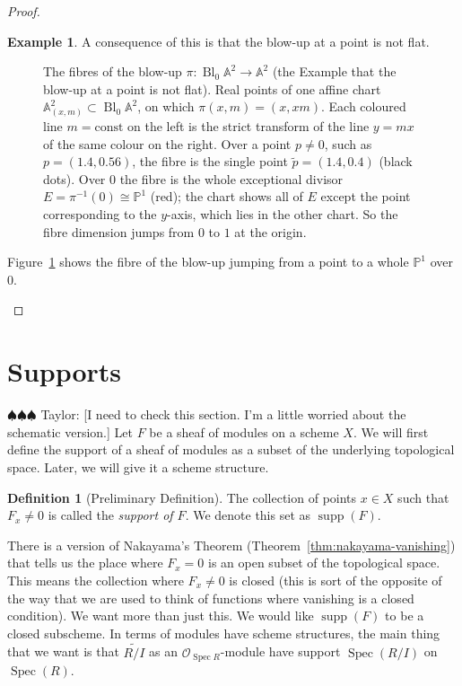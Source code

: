 \documentclass[12pt]{article}
\numberwithin{equation}{section}
\theoremstyle{definition}
\newtheorem{definition}[theorem]{Definition}
\newtheorem{example}[theorem]{Example}
\theoremstyle{remark}
\newcommand{\Ocal}{\mathcal{O}}
\newcommand{\PP}{\mathbb{P}}
\renewcommand{\AA}{\mathbb{A}}
\newcommand{\Spec}{\operatorname{Spec}}
\newcommand{\Bl}{\operatorname{Bl}}
\newcommand{\supp}{\operatorname{supp}}
\newcommand{\taylor}[1]{{\color{blue} \sf $\spadesuit\spadesuit\spadesuit$ Taylor: [#1]}}
\begin{document}
\begin{proof}
\begin{example}
	A consequence of this is that the blow-up at a point is not flat. 
\begin{figure}[H]
\centering

\caption{The fibres of the blow-up $\pi\colon\Bl_0\AA^2\to\AA^2$ (the Example that the blow-up at a point is not flat). Real points of one affine chart $\AA^2_{(x,m)}\subset\Bl_0\AA^2$, on which $\pi(x,m)=(x,xm)$. Each coloured line $m=\mathrm{const}$ on the left is the strict transform of the line $y=mx$ of the same colour on the right. Over a point $p\neq0$, such as $p=(1.4,0.56)$, the fibre is the single point $\tilde p=(1.4,0.4)$ (black dots). Over $0$ the fibre is the whole exceptional divisor $E=\pi^{-1}(0)\cong\PP^1$ (red); the chart shows all of $E$ except the point corresponding to the $y$-axis, which lies in the other chart. So the fibre dimension jumps from $0$ to $1$ at the origin.}\label{fig:blowup-not-flat}
\end{figure}
Figure~\ref{fig:blowup-not-flat} shows the fibre of the blow-up jumping from a point to a whole $\PP^1$ over $0$.
\end{example}

\end{proof}

\section{Supports}

\taylor{I need to check this section. I'm a little worried about the schematic version.}
Let $F$ be a sheaf of modules on a scheme $X$. 
We will first define the support of a sheaf of modules as a subset of the underlying topological space. 
Later, we will give it a scheme structure. 
\begin{definition}[Preliminary Definition]
	The collection of points $x\in X$ such that $F_x\neq 0$ is called the \emph{support of $F$}. We denote this set as $\supp(F)$.
\end{definition}

There is a version of Nakayama's Theorem (Theorem~\ref{thm:nakayama-vanishing}) that tells us the place where $F_x=0$ is an open subset of the topological space. 
This means the collection where $F_x\neq 0$ is closed (this is sort of the opposite of the way that we are used to think of functions where vanishing is a closed condition).
We want more than just this. 
We would like $\supp(F)$ to be a closed subscheme. 
In terms of modules have scheme structures, the main thing that we want is that $\widetilde{R/I}$ as an $\Ocal_{\Spec R}$-module have support $\Spec(R/I)$ on $\Spec(R)$.
\end{document}
